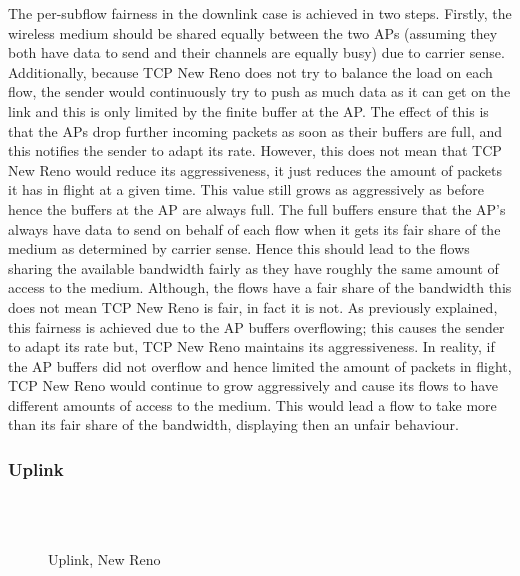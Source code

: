 The per-subflow fairness in the downlink case is achieved in two steps. Firstly,
the wireless medium should be shared equally between the two APs (assuming they
both have data to send and their channels are equally busy) due to carrier
sense. Additionally, because TCP New Reno does not try to balance the load on
each flow, the sender would continuously try to push as much data as it can get
on the link and this is only limited by the finite buffer at the AP. The effect
of this is that the APs drop further incoming packets as soon as their buffers are full, and this notifies the sender to adapt its rate. However, this does not mean that TCP New Reno would reduce its aggressiveness, it just reduces the amount of packets it has in flight at a given time. This value still grows as aggressively as before hence the buffers at the AP are always full. The full buffers ensure
that the AP's always have data to send on behalf of each flow when it gets its
fair share of the medium as determined by carrier sense. Hence this should lead
to the flows sharing the available bandwidth fairly as they have roughly the
same amount of access to the medium. 
Although, the flows have a fair share of the bandwidth this does not mean TCP New Reno is fair, in fact it is not. As previously explained, this fairness is achieved due to the AP buffers overflowing; this causes the sender to adapt its rate but, TCP New Reno maintains its aggressiveness. In reality, if the AP buffers did not overflow and hence limited the amount of packets in flight, TCP New Reno would continue to grow aggressively and cause its flows to have different amounts of access to the medium. This would lead a flow to take more than its fair share of the bandwidth, displaying then an unfair behaviour.  

\subsubsection{Uplink}
\label{sec:results-mptcp-up}

\begin{figure}[h]
  \centering
  \\
  \subfloat[][2.4 GHz, non-overlapping channels] {\
    \scalebox{0.70}{}\label{graph:cc-reno-up}
  }
  \\
  \subfloat[][5 and 2.4 GHz] {\
    \scalebox{0.70}{}\label{graph:cb-reno-up}
  }
  \caption{Uplink, New Reno}\label{graph:reno-up}
\end{figure}

